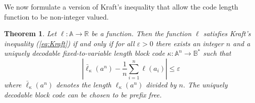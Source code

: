 \documentclass[10pt,a4paper,draft]{article}
\newtheorem{thm}{Theorem}
\begin{document}
We now formulate a version of Kraft's inequality that allow the
code length function to be non-integer valued. 
\begin{thm}
\label{Theorem:Kraft}Let $\ell:\mathbb{A}\rightarrow\mathbb{R}$
be a function. Then the function $\ell$ satisfies Kraft's inequality
(\ref{eq:Kraft})
if and only if for all $\varepsilon>0$ there exists an integer
$n$ and a uniquely decodable fixed-to-variable length block code
$\kappa:\mathbb{A}^{n}\rightarrow\mathbb{B}^{\ast}$
such that 
\[
\left\vert
\bar{\ell}_{\kappa}\left(a^{n}\right)-\frac{1}{n}\sum_{i=1}^{n}\ell\left(a_{i}\right)\right\vert
\leq\varepsilon
\]
where $\bar{\ell}_{\kappa}\left(a^{n}\right)$ denotes the length $\ell_{\kappa}\left(a^{n}\right)$ divided by $n.$ The uniquely decodable block code can be chosen to be prefix free. 
\end{thm}
\end{document}
